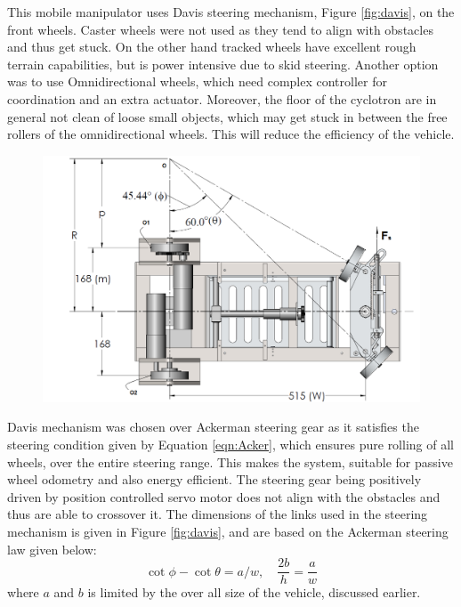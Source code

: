 This mobile manipulator uses Davis steering mechanism,  Figure \ref{fig:davis},  on the front wheels. Caster wheels  were not used as they tend to align with  obstacles and thus get stuck. On the  other hand tracked wheels have excellent rough terrain capabilities, but is power intensive due to skid steering. Another option was to use   Omnidirectional wheels, which need complex controller for coordination and an extra actuator. Moreover, the  floor of the cyclotron are  in general not clean of loose small objects, which may get stuck in between the free rollers of the omnidirectional wheels. This will reduce the efficiency of the vehicle.  

\begin{figure}
 	\centering
	\includegraphics[width=\linewidth,keepaspectratio]{Chapter3/fig/steerringCondition}
	\label{fig:steerCond} 
\end{figure} 
 

Davis mechanism was chosen over Ackerman steering gear as it satisfies the steering condition given by  Equation \ref{eqn:Acker}, which ensures pure rolling of all  wheels, over the entire steering range. This makes the system, suitable for passive wheel odometry and also energy efficient.  The steering gear being positively driven by position controlled servo motor does not align with the obstacles and thus are able to crossover it. The dimensions of the links used in the steering mechanism is given in Figure \ref{fig:davis}, and are based on the Ackerman steering law given below:
\begin{equation}
\label{eqn:Acker}
\cot\phi-\cot\theta=a/w, \quad  \frac{2b}{h}=\frac{a}{w}
\end{equation}
where $a$ and $b$ is limited by the over all size of the vehicle, discussed earlier.

